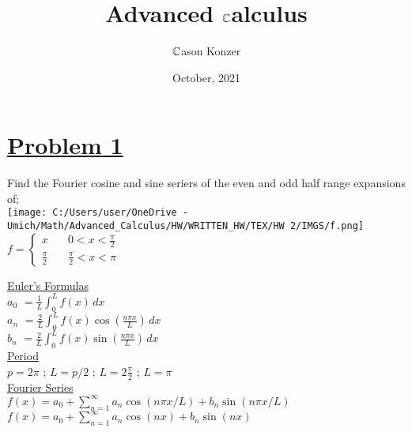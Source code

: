 \documentclass[a4paper,man,natbib]{apa6}
\title{Advanced $\mathbb{C}$alculus}
\author{$\mathbb{C}$ason Konzer}
\date{October, 2021}
\affiliation{University of Michigan}
\begin{document}
\maketitle


\section{\underline{Problem 1}}
\label{sec: Problem 1}

\begin{center}

    Find the Fourier cosine and sine seriers of the even and odd half range expansions of; \\ 

    \texttt{[image: C:/Users/user/OneDrive - Umich/Math/Advanced\_Calculus/HW/WRITTEN\_HW/TEX/HW 2/IMGS/f.png]} \\

    \color{teal}
    $ f = \begin{cases}
        x & \quad 0 < x < \frac{\pi}{2} \\
        \frac{\pi}{2} &  \quad \frac{\pi}{2} < x < \pi
    \end{cases}$ \\
    \color{black}

    \hfill \break
    \underline{Euler's Formulas} \\

    \color{purple} $ a_0 $ \color{black} $ = \frac{1}{L}  \int_{0}^{L} f(x) \,dx $ \\

    \color{blue} $ a_n $ \color{black} $ = \frac{2}{L}  \int_{0}^{L} f(x) \cos(\frac{n\pi x}{L}) \,dx $ \\

    \color{red} $ b_n $ \color{black} $ = \frac{2}{L}  \int_{0}^{L} f(x) \sin(\frac{n\pi x}{L}) \,dx $ \\

    \hfill \break
    \underline{Period} \\

    $ p = 2\pi $ ; $ L = p/2 $ ; $ L = 2\frac{\pi}{2} $ ; $ L = \pi $ \\ 

    \underline{Fourier Series} \\

    $ f(x) = a_0 + \sum_{n = 1}^{\infty} a_n \cos(n\pi x/L) + b_n \sin (n\pi x/L) $ \\
    $ f(x) = a_0 + \sum_{n = 1}^{\infty} a_n \cos(nx) + b_n \sin (nx) $ \\


\end{center}
\end{document}
